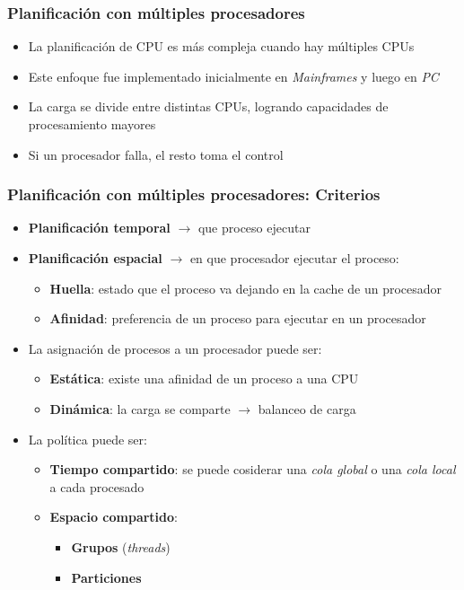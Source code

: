 \begin{frame}
  \frametitle{Planificación con múltiples procesadores}
	\begin{itemize}
		\item La planificación de CPU es más compleja cuando hay múltiples CPUs	
		\item Este enfoque fue implementado inicialmente en \textit{Mainframes} y luego en \textit{PC}
		\item La carga se divide entre distintas CPUs, logrando capacidades de procesamiento mayores
		\item Si un procesador falla, el resto toma el control
	\end{itemize}
\end{frame}

\begin{frame}
  \frametitle{Planificación con múltiples procesadores: \textbf{Criterios}}
	\begin{itemize}
		\item \textbf{Planificación temporal} $\rightarrow$ que proceso ejecutar
		\item \textbf{Planificación espacial} $\rightarrow$ en que procesador ejecutar el proceso:		
		\begin{itemize}
			\item \textbf{Huella}: estado que el proceso va dejando en la cache de un procesador
			\item \textbf{Afinidad}: preferencia de un proceso para ejecutar en un procesador 
		\end{itemize}
		\item La asignación de procesos a un procesador puede ser:
		\begin{itemize}
			\item \textbf{Estática}: existe una afinidad de un proceso a una CPU
			\item \textbf{Dinámica}: la carga se comparte $\rightarrow$ balanceo de carga
		\end{itemize}
		\item La política puede ser:
		\begin{itemize}
			\item \textbf{Tiempo compartido}: se puede cosiderar una \emph{cola global} o una \emph{cola local} a cada procesado
			\item \textbf{Espacio compartido}:
			\begin{itemize}
				\item \textbf{Grupos} (\emph{threads})
				\item \textbf{Particiones}
			\end{itemize}
		\end{itemize}		
	\end{itemize}
\end{frame}

